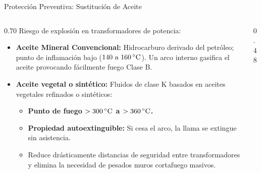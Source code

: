 \begin{frame}{Protección Preventiva: Sustitución de Aceite}
  \begin{columns}[c]
    \begin{column}{0.70\textwidth}
      \small
      Riesgo de explosión en transformadores de potencia:
      \begin{itemize}
        \scriptsize
        \item \textbf{Aceite Mineral Convencional:} Hidrocarburo derivado del
            petróleo; punto de inflamación bajo ($140\text{ a }160\,^\circ\mathrm{C}$).
              Un arco interno gasifica el aceite provocando fácilmente fuego Clase B.
        \item \textbf{Aceite vegetal o sintético:} Fluidos de clase K basados en
            aceites vegetales refinados o sintéticos:
        \begin{itemize}
          \tiny
          \item \textbf{Punto de fuego $> 300\,^\circ\mathrm{C}$ a $> 360\,^\circ\mathrm{C}$.}
          \item \textbf{Propiedad autoextinguible:} Si cesa el arco, la llama se extingue sin asistencia.
          \item Reduce drásticamente distancias de seguridad entre transformadores y elimina la necesidad de pesados muros cortafuego masivos.
        \end{itemize}
      \end{itemize}
    \end{column}

    \begin{column}{0.48\textwidth}
      \centering
    \end{column}
  \end{columns}
\end{frame}

